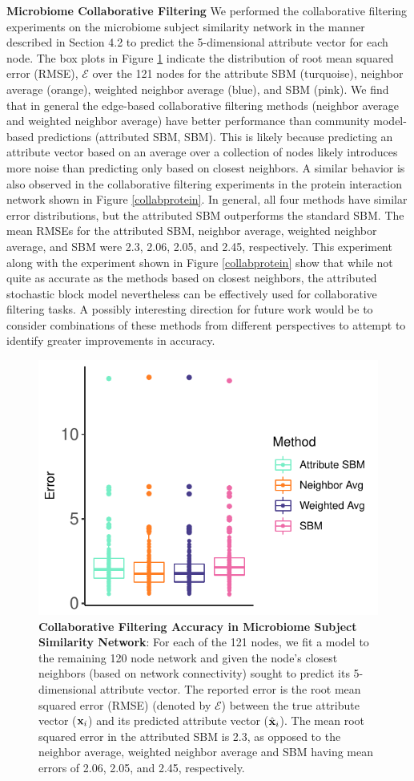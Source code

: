{\bf Microbiome Collaborative Filtering}
We performed the collaborative filtering experiments on the microbiome subject similarity network in the manner described in Section 4.2 to predict the 5-dimensional attribute vector for each node. The box plots in Figure \ref{Fig6} indicate the distribution of root mean squared error (RMSE), ${\mathcal E}$ over the 121 nodes for the attribute SBM (turquoise), neighbor average (orange), weighted neighbor average (blue), and SBM (pink). We find that in general the edge-based collaborative filtering methods (neighbor average and weighted neighbor average) have better performance than community model-based predictions (attributed SBM, SBM). This is likely because predicting an attribute vector based on an average over a collection of nodes likely introduces more noise than predicting only based on closest neighbors. A similar behavior is also observed in the collaborative filtering experiments in the protein interaction network shown in Figure \ref{collabprotein}. In general, all four methods have similar error distributions, but the attributed SBM outperforms the standard SBM. The mean RMSEs for the attributed SBM, neighbor average, weighted neighbor average, and SBM were 2.3, 2.06, 2.05, and 2.45, respectively. This experiment along with the experiment shown in Figure \ref{collabprotein} show that while not quite as accurate as the methods based on closest neighbors, the attributed stochastic block model nevertheless can be effectively used for collaborative filtering tasks. A possibly interesting direction for future work would be to consider combinations of these methods from different perspectives to attempt to identify greater improvements in accuracy.
\begin{figure}[h!]
\begin{center}
\includegraphics[width=.5\textwidth]{CollabSBM_Micro.pdf}
\caption{{\bf Collaborative Filtering Accuracy in Microbiome Subject Similarity Network}: For each of the 121 nodes, we fit a model to the remaining 120 node network and given the node's closest  neighbors (based on network connectivity) sought to predict its 5-dimensional attribute vector. The reported error is the root mean squared error (RMSE) (denoted by $\mathcal{E}$) between the true attribute vector (${\bf x}_{i}$) and its predicted attribute vector (${\hat{\bf x}}_{i}$). The mean root squared error in the attributed SBM is 2.3, as opposed to the neighbor average, weighted neighbor average and SBM having mean errors of 2.06, 2.05, and 2.45, respectively. }
\label{Fig6}
\end{center}
\end{figure}

